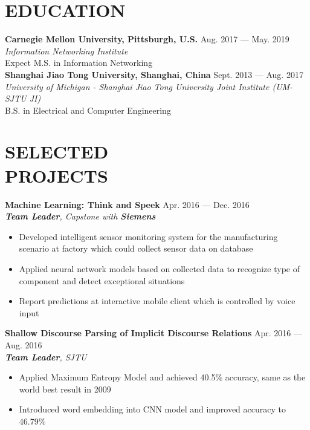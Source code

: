 \documentclass[margin,line,10pt]{res}
\begin{document}
\address{\small $\bullet$ wu.hao.cz.21@gmail.com $\bullet$ 1 (412)-616-6280 $\bullet$ Apt.603, South Aiken Ave., Pittsburgh, PA, 15232}
 
\begin{resume}

\section{EDUCATION}
{
\small
\textbf{Carnegie Mellon University, Pittsburgh, U.S.} \hfill Aug. 2017 --- May. 2019\\
\textit{Information Networking Institute}\\
Expect M.S. in Information Networking
}\\
{
\small
\textbf{Shanghai Jiao Tong University, Shanghai, China} \hfill Sept. 2013 --- Aug. 2017\\
\textit{University of Michigan - Shanghai Jiao Tong University Joint Institute (UM-SJTU JI)}\\
B.S. in Electrical and Computer Engineering
}


\section{SELECTED\\PROJECTS}
{
\small
{\bf Machine Learning: Think and Speek} \hfill Apr. 2016 --- Dec. 2016\\
{\it \textbf{Team Leader}, Capstone with {\bf Siemens}}
}
\begin{itemize}
\setlength{\itemsep}{0pt}
\setlength{\parskip}{0pt}
\setlength{\parsep}{0pt}
\item {\small Developed intelligent sensor monitoring system for the manufacturing scenario at factory which could collect sensor data on database}
\item {\small Applied neural network models based on collected data to recognize type of component and detect exceptional situations}
\item {\small Report predictions at interactive mobile client which is controlled by voice input}
\end{itemize}
{
\small
{\bf Shallow Discourse Parsing of Implicit Discourse Relations} \hfill Apr. 2016 ---  Aug. 2016\\
{\it \textbf{Team Leader}, SJTU}
}
\begin{itemize}
\setlength{\itemsep}{0pt}
\setlength{\parskip}{0pt}
\setlength{\parsep}{0pt}
\item {\small Applied Maximum Entropy Model and achieved 40.5\% accuracy, same as the world best result in 2009}
\item {\small Introduced word embedding into CNN model and improved accuracy to 46.79\%}
\end{itemize}


\end{resume}
\end{document}

